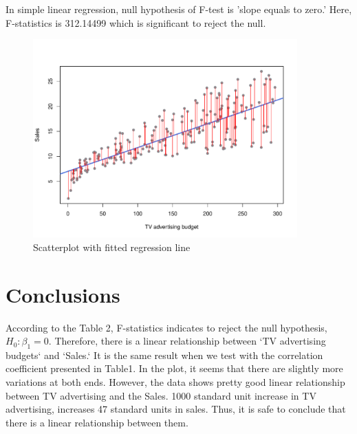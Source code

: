 \documentclass{article}
\begin{document}
In simple linear regression, null hypothesis of F-test is 'slope equals to zero.' Here, F-statistics is 312.14499 which is significant to reject the null.


\begin{figure}[!htb]
  \begin{center}
    \caption{Scatterplot with fitted regression line}
    \centering
      \includegraphics[width=4in]{scatterplot-tv-sales.pdf}
  \end{center}
\end{figure}


\section{Conclusions}
According to the Table 2, F-statistics indicates to reject the null hypothesis, $H_0 : \beta_{1} = 0$. Therefore, there is a linear relationship between `TV advertising budgets` and `Sales.` It is the same result when we test with the correlation coefficient presented in Table1. In the plot, it seems that there are slightly more variations at both ends. However, the data shows pretty good linear relationship between TV advertising and the Sales. 1000 standard unit increase in TV advertising, increases 47 standard units in sales. Thus, it is safe to conclude that there is a linear relationship between them. 
\end{document}
